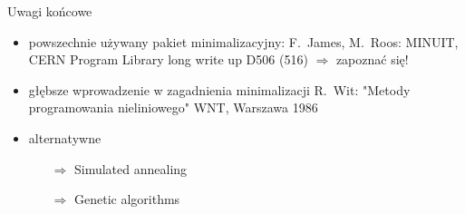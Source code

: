   \begin{frame}{Uwagi końcowe}
    \begin{itemize}
      \item powszechnie używany pakiet minimalizacyjny:
      F.~James, M.~Roos: MINUIT, CERN Program Library
      long write up D506 (516) $\Rightarrow$ zapoznać się!
      \item głębsze wprowadzenie w zagadnienia minimalizacji
      R.~Wit: "Metody programowania nieliniowego" WNT, Warszawa
      1986
      \item alternatywne
      \begin{itemize}
        \item[$\Rightarrow$] Simulated annealing
        \item[$\Rightarrow$] Genetic algorithms
      \end{itemize}
    \end{itemize}
  \end{frame}
